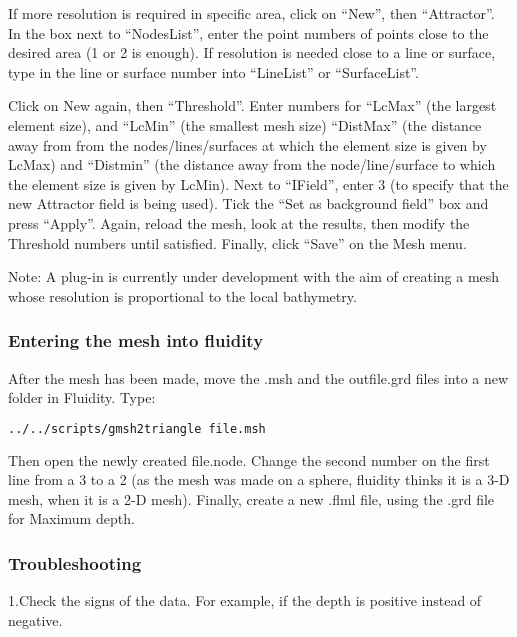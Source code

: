 If more resolution is required in specific area, click on “New”, then “Attractor”. In the box next to “NodesList”, enter 
the point numbers of points close to the desired area (1 or 2 is enough). If resolution is needed close to a line or surface, 
type in the line or surface number into “LineList” or “SurfaceList”. 

Click on New again, then “Threshold”. Enter numbers for “LcMax” (the largest element size), and “LcMin” (the smallest mesh size) 
“DistMax” (the distance away from from the nodes/lines/surfaces at which the element size is given by LcMax) and “Distmin” 
(the distance away from the node/line/surface to which the element size is given by LcMin). Next to “IField”, enter 3 
(to specify that the new Attractor field is being used). Tick the “Set as background field” box and press “Apply”. Again, 
reload the mesh, look at the results, then modify the Threshold numbers until satisfied. Finally, click “Save” on the Mesh menu.

Note: A plug-in is currently under development with the aim of creating a mesh whose resolution is proportional to the local bathymetry.

\subsubsection{Entering the mesh into fluidity}

After the mesh has been made, move the .msh and the outfile.grd files into a new folder in Fluidity. Type:
\begin{lstlisting}[language = Bash]
	 ../../scripts/gmsh2triangle file.msh
\end{lstlisting}

Then open the newly created file.node. Change the second number on the first line from a 3 to a 2 (as the mesh was made on a sphere,
fluidity thinks it is a 3-D mesh, when it is a 2-D mesh). Finally, create a new .flml file, using the .grd file for Maximum depth.

\subsubsection{Troubleshooting}

1.Check the signs of the data. For example, if the depth is positive instead of negative.

